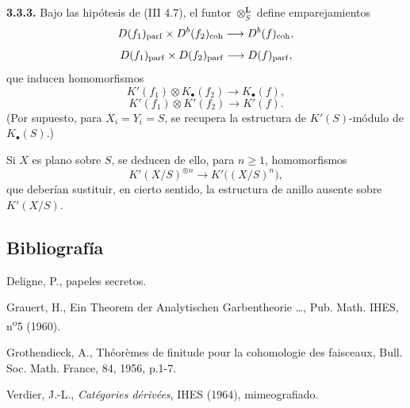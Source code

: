 \textbf{3.3.3.} Bajo las hipótesis de (III 4.7), el funtor \(\otimes_S^{\mathbf L}\) define emparejamientos
\[
 D(f_1)_{\mathrm{parf}}\times D^b(f_2)_{\mathrm{coh}}\longrightarrow D^b(f)_{\mathrm{coh}},
\]
\[
 D(f_1)_{\mathrm{parf}}\times D(f_2)_{\mathrm{parf}}\longrightarrow D(f)_{\mathrm{parf}},
\]
que inducen homomorfismos
\[
 K'(f_1)\otimes K_{\bullet}(f_2)\longrightarrow K_{\bullet}(f),
\]
\[
 K'(f_1)\otimes K'(f_2)\longrightarrow K'(f).
\]
(Por supuesto, para \(X_i=Y_i=S\), se recupera la estructura de \(K'(S)\)-módulo de \(K_{\bullet}(S)\).)

Si \(X\) es plano sobre \(S\), se deducen de ello, para \(n\geq1\), homomorfismos
\[
 K'(X/S)^{\otimes n}\longrightarrow K'\bigl((X/S)^n\bigr),
\]
que deberían sustituir, en cierto sentido, la estructura de anillo ausente sobre \(K'(X/S)\).

\subsection*{Bibliografía}
\begin{enumerate}[label={[\arabic*]}]
\item Deligne, P., papeles secretos.
\item Grauert, H., Ein Theorem der Analytischen Garbentheorie \dots, Pub. Math. IHES, n\textsuperscript{o}5 (1960).
\item Grothendieck, A., Théorèmes de finitude pour la cohomologie des faisceaux, Bull. Soc. Math. France, 84, 1956, p.1-7.
\item[{[V]}] Verdier, J.-L., \emph{Catégories dérivées}, IHES (1964), mimeografiado.
\end{enumerate}

